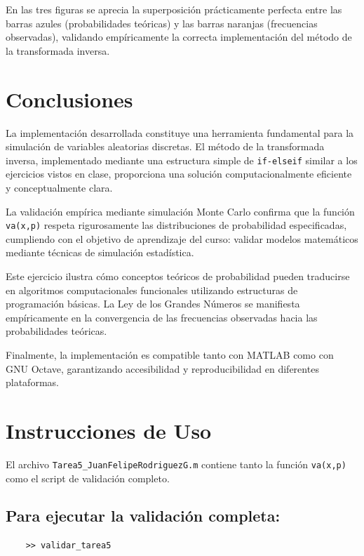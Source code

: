\documentclass{article}
\begin{document}
    En las tres figuras se aprecia la superposición prácticamente perfecta entre las barras azules (probabilidades teóricas) y las barras naranjas (frecuencias observadas), validando empíricamente la correcta implementación del método de la transformada inversa.
    
    \section*{Conclusiones}
    
    La implementación desarrollada constituye una herramienta fundamental para la simulación de variables aleatorias discretas. El método de la transformada inversa, implementado mediante una estructura simple de \texttt{if-elseif} similar a los ejercicios vistos en clase, proporciona una solución computacionalmente eficiente y conceptualmente clara.
    
    La validación empírica mediante simulación Monte Carlo confirma que la función \texttt{va(x,p)} respeta rigurosamente las distribuciones de probabilidad especificadas, cumpliendo con el objetivo de aprendizaje del curso: validar modelos matemáticos mediante técnicas de simulación estadística.
    
    Este ejercicio ilustra cómo conceptos teóricos de probabilidad pueden traducirse en algoritmos computacionales funcionales utilizando estructuras de programación básicas. La Ley de los Grandes Números se manifiesta empíricamente en la convergencia de las frecuencias observadas hacia las probabilidades teóricas.
    
    Finalmente, la implementación es compatible tanto con MATLAB como con GNU Octave, garantizando accesibilidad y reproducibilidad en diferentes plataformas.
    
    \section*{Instrucciones de Uso}
    
    El archivo \texttt{Tarea5\_JuanFelipeRodriguezG.m} contiene tanto la función \texttt{va(x,p)} como el script de validación completo.
    
    \subsection*{Para ejecutar la validación completa:}
    \begin{verbatim}
    >> validar_tarea5
    \end{verbatim}
    
\end{document}
